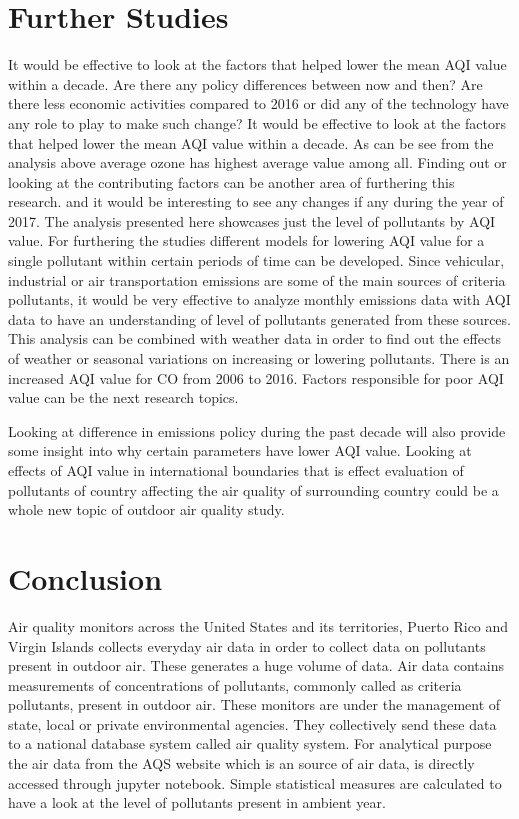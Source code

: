 \documentclass[sigconf]{acmart}
\begin{document}
\section{Further Studies}
   It would be effective to look at the factors that helped lower the mean AQI value within a decade. Are there any policy differences between now and then? Are there less economic activities compared to 2016 or did any of the technology have any role to play to make such change? It would be effective to look at the factors that helped lower the mean AQI value within a decade. As can be see from the analysis above average ozone has highest average value among all. Finding out or looking at the contributing factors can be another area of furthering this research. and it would be interesting to see any changes if any during the year of 2017. The analysis presented here showcases just the level of pollutants by AQI value. For furthering the studies different models for lowering AQI value for a single pollutant within certain periods of time can be developed. Since vehicular, industrial or air transportation emissions are some of the main sources of criteria pollutants, it would be very effective to analyze monthly emissions data with AQI data to have an understanding of level of pollutants generated from these sources. This analysis can be combined with weather data in order to find out the effects of weather or seasonal variations on increasing or lowering pollutants. There is an increased AQI value for CO from 2006 to 2016. Factors responsible for poor AQI value can be the next research topics. 
   
   Looking at difference in emissions policy during the past decade will also provide some insight into why certain parameters have lower AQI value. Looking at effects of AQI value in international boundaries that is effect evaluation of pollutants of country affecting the air quality of surrounding country could be a whole new topic of outdoor air quality study.



\section{Conclusion}
   
   Air quality monitors across the United States and its territories, Puerto Rico and Virgin Islands collects everyday air data in order to collect data on pollutants present in outdoor air. These generates a  huge volume of data. Air data contains measurements of concentrations of pollutants, commonly called as criteria pollutants, present in outdoor air. These monitors are under the management of state, local or private environmental agencies. They collectively send these data to a national database system called air quality system. For analytical purpose the air data from the AQS website which is an source of air data, is directly accessed through jupyter notebook. Simple statistical measures are calculated to have a look at the level of pollutants present in ambient year.
   
\end{document}
